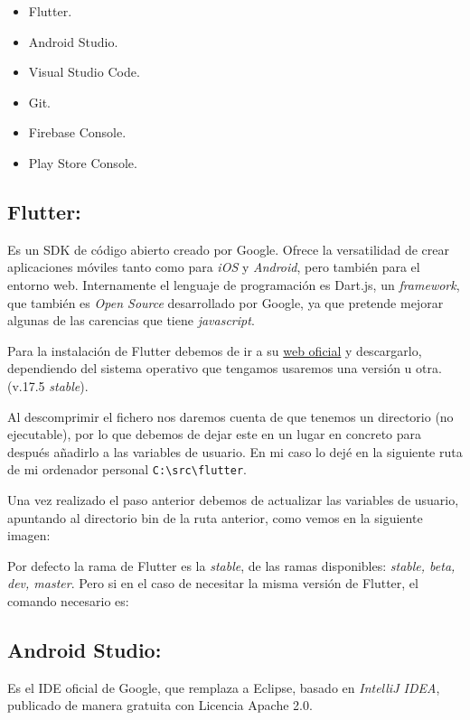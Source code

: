 \begin{itemize}
	\tightlist
	\item Flutter.
	\item Android Studio.
	\item Visual Studio Code.
	\item Git.
	\item Firebase Console.
	\item Play Store Console.
\end{itemize}

\subsection{Flutter:}
Es un SDK de código abierto creado por Google. Ofrece la versatilidad de crear aplicaciones móviles tanto como para \emph{iOS} y \emph{Android}, pero también para el entorno web. Internamente el lenguaje de programación es Dart.js, un \emph{framework}, que también es \emph{Open Source} desarrollado por Google, ya que pretende mejorar algunas de las carencias que tiene \emph{javascript}.

Para la instalación de Flutter debemos de ir a su \href{https://flutter.dev/docs/get-started/install}{web oficial} y descargarlo, dependiendo del sistema operativo que tengamos usaremos una versión u otra. (v.17.5 \emph{stable}).

Al descomprimir el fichero nos daremos cuenta de que tenemos un directorio (no ejecutable), por lo que debemos de dejar este en un lugar en concreto para después añadirlo a las variables de usuario. En mi caso lo dejé en la siguiente ruta de mi ordenador personal \verb|C:\src\flutter|.

Una vez realizado el paso anterior debemos de actualizar las variables de usuario, apuntando al directorio bin de la ruta anterior, como vemos en la siguiente imagen:


Por defecto la rama de Flutter es la \emph{stable}, de las ramas disponibles: \emph{stable, beta, dev, master}. Pero si en el caso de necesitar la misma versión de Flutter, el comando necesario es:



\subsection{Android Studio:}
Es el IDE oficial de Google, que remplaza a Eclipse, basado en \emph{IntelliJ IDEA}, publicado de manera gratuita con Licencia Apache 2.0.


